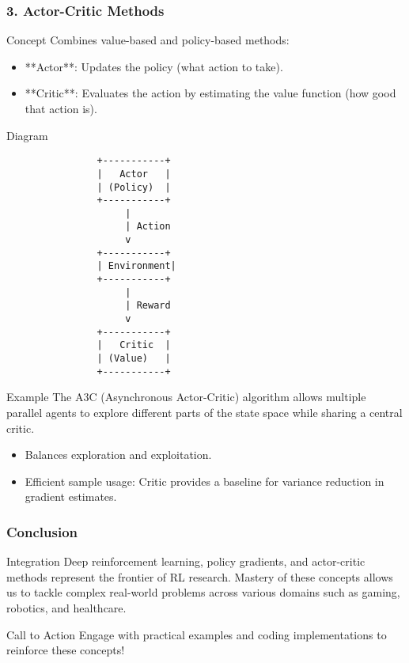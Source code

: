 \documentclass[aspectratio=169]{beamer}
\begin{document}
\begin{frame}[fragile]
    \frametitle{3. Actor-Critic Methods}
    \begin{block}{Concept}
        Combines value-based and policy-based methods:
        \begin{itemize}
            \item **Actor**: Updates the policy (what action to take).
            \item **Critic**: Evaluates the action by estimating the value function (how good that action is).
        \end{itemize}
    \end{block}

    \begin{block}{Diagram}
        \centering
        \begin{verbatim}
                +-----------+
                |   Actor   |
                | (Policy)  |
                +-----------+
                     |
                     | Action
                     v
                +-----------+
                | Environment|
                +-----------+
                     |
                     | Reward
                     v
                +-----------+
                |   Critic  |
                | (Value)   |
                +-----------+
        \end{verbatim}
    \end{block}

    \begin{block}{Example}
        The A3C (Asynchronous Actor-Critic) algorithm allows multiple parallel agents to explore different parts of the state space while sharing a central critic.
    \end{block}

    \begin{itemize}
        \item Balances exploration and exploitation.
        \item Efficient sample usage: Critic provides a baseline for variance reduction in gradient estimates.
    \end{itemize}
\end{frame}

\begin{frame}[fragile]
    \frametitle{Conclusion}
    \begin{block}{Integration}
        Deep reinforcement learning, policy gradients, and actor-critic methods represent the frontier of RL research. Mastery of these concepts allows us to tackle complex real-world problems across various domains such as gaming, robotics, and healthcare.
    \end{block}
    
    \begin{block}{Call to Action}
        Engage with practical examples and coding implementations to reinforce these concepts!
    \end{block}
\end{frame}
\end{document}
